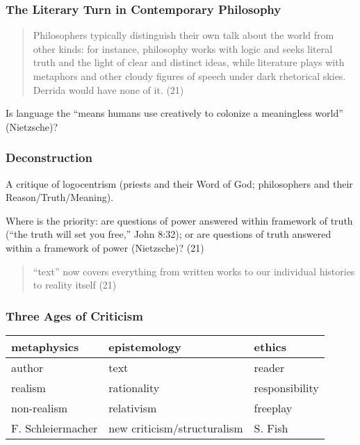 \documentclass[xcolor=dvipsnames]{beamer}
\begin{document}
\begin{frame}
  \frametitle{The Literary Turn in Contemporary Philosophy}
  \begin{quote}
    Philosophers typically distinguish their own talk about the world
    from other kinds: for instance, philosophy works with logic and
    seeks literal truth and the light of clear and distinct ideas, while
    literature plays with metaphors and other cloudy figures of
    speech under dark rhetorical skies. Derrida would have none of
    it. (21)
  \end{quote}
  Is language the ``means humans use creatively to colonize a
  meaningless world'' (Nietzsche)?
\end{frame}

\begin{frame}
  \frametitle{Deconstruction}
  A critique of logocentrism (priests and their Word of God;
  philosophers and their Reason/Truth/Meaning).

  \bigskip

  Where is the priority: are questions of power answered within
  framework of truth (``the truth will set you free,'' John 8:32); or
  are questions of truth answered within a framework of power
  (Nietzsche)? (21)
  \begin{quote}
    ``text'' now covers everything from written works to our
    individual histories to reality itself (21)
  \end{quote}
\end{frame}

\begin{frame}
  \frametitle{Three Ages of Criticism}
  \begin{tabular}{|l|l|l|}\hline
        metaphysics       & epistemology                & ethics         \\ \hline 
        author            & text                        & reader         \\ \hline
        realism           & rationality                 & responsibility \\ \hline
        non-realism       & relativism                  & freeplay       \\ \hline
        F. Schleiermacher & new criticism/structuralism & S. Fish        \\ \hline
  \end{tabular}
\end{frame}
\end{document}
